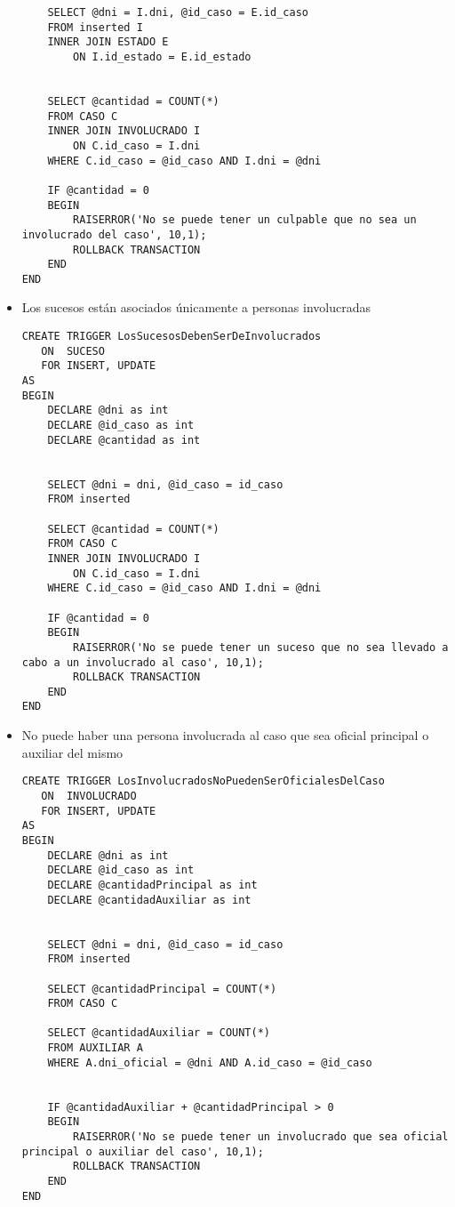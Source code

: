 \begin{itemize}
\begin{lstlisting}
    SELECT @dni = I.dni, @id_caso = E.id_caso
	FROM inserted I
	INNER JOIN ESTADO E
		ON I.id_estado = E.id_estado


	SELECT @cantidad = COUNT(*) 
	FROM CASO C
	INNER JOIN INVOLUCRADO I
		ON C.id_caso = I.dni
	WHERE C.id_caso = @id_caso AND I.dni = @dni

	IF @cantidad = 0
	BEGIN
		RAISERROR('No se puede tener un culpable que no sea un involucrado del caso', 10,1);
		ROLLBACK TRANSACTION
	END
END
\end{lstlisting}

\item Los sucesos están asociados únicamente a personas involucradas\\
\begin{lstlisting}
CREATE TRIGGER LosSucesosDebenSerDeInvolucrados
   ON  SUCESO
   FOR INSERT, UPDATE
AS 
BEGIN
	DECLARE @dni as int
	DECLARE @id_caso as int	
	DECLARE @cantidad as int
	

    SELECT @dni = dni, @id_caso = id_caso
	FROM inserted

	SELECT @cantidad = COUNT(*) 
	FROM CASO C
	INNER JOIN INVOLUCRADO I
		ON C.id_caso = I.dni
	WHERE C.id_caso = @id_caso AND I.dni = @dni

	IF @cantidad = 0
	BEGIN
		RAISERROR('No se puede tener un suceso que no sea llevado a cabo a un involucrado al caso', 10,1);
		ROLLBACK TRANSACTION
	END
END
\end{lstlisting}

\item No puede haber una persona involucrada al caso que sea oficial principal o auxiliar del mismo\\
\begin{lstlisting}
CREATE TRIGGER LosInvolucradosNoPuedenSerOficialesDelCaso
   ON  INVOLUCRADO
   FOR INSERT, UPDATE
AS 
BEGIN
	DECLARE @dni as int
	DECLARE @id_caso as int	
	DECLARE @cantidadPrincipal as int
	DECLARE @cantidadAuxiliar as int
	

    SELECT @dni = dni, @id_caso = id_caso
	FROM inserted

	SELECT @cantidadPrincipal = COUNT(*) 
	FROM CASO C

	SELECT @cantidadAuxiliar = COUNT(*)
	FROM AUXILIAR A
	WHERE A.dni_oficial = @dni AND A.id_caso = @id_caso


	IF @cantidadAuxiliar + @cantidadPrincipal > 0
	BEGIN
		RAISERROR('No se puede tener un involucrado que sea oficial principal o auxiliar del caso', 10,1);
		ROLLBACK TRANSACTION
	END
END
\end{lstlisting}
\end{itemize}
